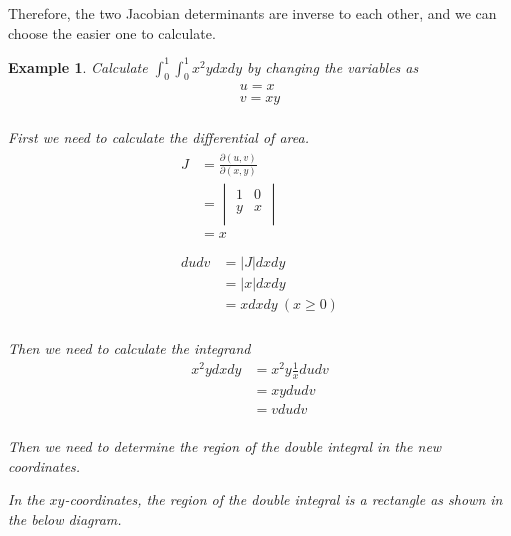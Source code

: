 \documentclass{article}
\newtheorem{example}{Example}
\begin{document}
Therefore, the two Jacobian determinants are inverse to each other, and we can 
choose the easier one to calculate.

\begin{example}
  Calculate $\int_0^1 \int_0^1 x^2 y dx dy$ by changing the variables as
  \begin{gather*}
    u = x \\
    v = xy \\
  \end{gather*}

  First we need to calculate the differential of area.
  \begin{gather*}
    \begin{split}
      J &= \frac{\partial(u, v)}{\partial(x, y)} \\
        &= \begin{vmatrix}
             1 & 0 \\
             y & x \\
           \end{vmatrix} \\
        &= x \\
    \end{split} \\
    \begin{split}
      du dv &= |J| dx dy \\
            &= |x| dx dy \\
            &= x dx dy \ (x \geq 0)
    \end{split} \\
  \end{gather*}

  Then we need to calculate the integrand
  \begin{equation*}
    \begin{split}
      x^2 y dx dy &= x^2 y \frac{1}{x} du dv \\
                  &= xy du dv \\
                  &= v du dv \\
    \end{split}
  \end{equation*}

  Then we need to determine the region of the double integral in the new 
  coordinates.

  In the $xy$-coordinates, the region of the double integral is a rectangle as 
  shown in the below diagram.



\end{example}
\end{document}
